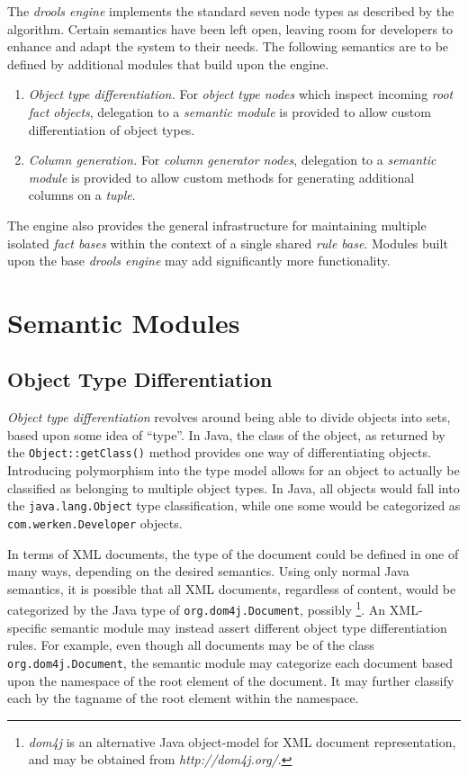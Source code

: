 \documentclass[10pt,twocolumn,letterpaper]{article}
\begin{document}
The \emph{drools engine} implements the standard seven node types
as described by the algorithm.  Certain semantics have been left
open, leaving room for developers to enhance and adapt the system
to their needs.  The following semantics are to be defined by
additional modules that build upon the engine.

\begin{enumerate}

	\item \emph{Object type differentiation.} For \emph{object type
	nodes} which inspect incoming \emph{root fact objects}, delegation
	to a \emph{semantic module} is provided to allow custom differentiation of object
	types.

	\item \emph{Column generation.} For \emph{column generator nodes},
	delegation to a \emph{semantic module} is provided to allow custom methods for
	generating additional columns on a \emph{tuple}.

\end{enumerate}

The engine also provides the general infrastructure for maintaining
multiple isolated \emph{fact bases} within the context of a single
shared \emph{rule base}.  Modules built upon the base \emph{drools
engine} may add significantly more functionality.


\section{Semantic Modules}

\subsection{Object Type Differentiation}

\emph{Object type differentiation} revolves around being able
to divide objects into sets, based upon some idea of ``type''.  In 
Java, the class of the object, as returned by the
\verb|Object::getClass()| method provides one way of differentiating
objects.  Introducing polymorphism into the type model allows for
an object to actually be classified as belonging to multiple object
types.  In Java, all objects would fall into the
\verb|java.lang.Object| type classification, while one some would
be categorized as \verb|com.werken.Developer| objects.

In terms of XML documents, the type of the document could be defined
in one of many ways, depending on the desired semantics.  Using only normal
Java semantics, it is possible that all XML documents, regardless of
content, would be categorized by the Java type of
\verb|org.dom4j.Document|, possibly%
	\footnote{\emph{dom4j} is an alternative Java object-model 
		for XML document representation, and may be obtained 
		from \emph{http://dom4j.org/}.}.
An XML-specific semantic module may instead assert different object
type differentiation rules.  For example, even though all documents
may be of the class \verb|org.dom4j.Document|, the semantic module
may categorize each document based upon the namespace of the root
element of the document.  It may further classify each by the tagname
of the root element within the namespace.
\end{document}
